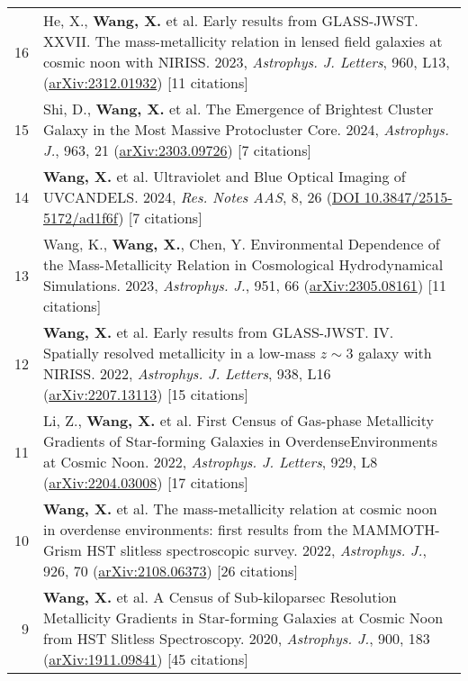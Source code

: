 \documentclass[letterpaper,10pt]{article}
\begin{document}
\begin{longtable}{rp{6.3in}}
    16 & He, X., \textbf{Wang, X.} et al. Early results from GLASS-JWST. XXVII. The mass-metallicity relation in lensed field galaxies at cosmic noon with NIRISS. 2023, \textit{Astrophys. J. Letters}, 960, L13, (\href{https://arxiv.org/abs/2312.01932}{arXiv:2312.01932}) [11 citations] \\

    15 & Shi, D., \textbf{Wang, X.} et al. The Emergence of Brightest Cluster Galaxy in the Most Massive Protocluster Core. 2024, \textit{Astrophys. J.}, 963, 21 (\href{https://arxiv.org/abs/2303.09726}{arXiv:2303.09726}) [7 citations] \\

    14 &  \textbf{Wang, X.} et al. Ultraviolet and Blue Optical Imaging of UVCANDELS. 2024, \textit{Res. Notes AAS}, 8, 26 (\href{https://iopscience.iop.org/article/10.3847/2515-5172/ad1f6f}{DOI 10.3847/2515-5172/ad1f6f}) [7 citations] \\

    13 &  Wang, K., \textbf{Wang, X.}, Chen, Y. Environmental Dependence of the Mass-Metallicity Relation in Cosmological Hydrodynamical Simulations. 2023, \textit{Astrophys. J.}, 951, 66 (\href{https://arxiv.org/abs/2305.08161}{arXiv:2305.08161}) [11 citations] \\

    12 &  \textbf{Wang, X.} et al. Early results from GLASS-JWST. IV. Spatially resolved metallicity in a low-mass $z\sim3$ galaxy with NIRISS. 2022, \textit{Astrophys. J. Letters}, 938, L16 (\href{https://arxiv.org/abs/2207.13113}{arXiv:2207.13113}) [15 citations] \\

    11 &  Li, Z., \textbf{Wang, X.} et al. First Census of Gas-phase Metallicity Gradients of Star-forming Galaxies in OverdenseEnvironments at Cosmic Noon. 2022, \textit{Astrophys. J. Letters}, 929, L8 (\href{https://arxiv.org/abs/2204.03008}{arXiv:2204.03008}) [17 citations] \\

    10 &  \textbf{Wang, X.} et al. The mass-metallicity relation at cosmic noon in overdense environments: first results from the MAMMOTH-Grism HST slitless spectroscopic survey. 2022, \textit{Astrophys. J.}, 926, 70 (\href{https://arxiv.org/abs/2108.06373}{arXiv:2108.06373}) [26 citations] \\

    9 &  \textbf{Wang, X.} et al. A Census of Sub-kiloparsec Resolution Metallicity Gradients in Star-forming Galaxies at Cosmic Noon from HST Slitless Spectroscopy. 2020, \textit{Astrophys. J.}, 900, 183 (\href{https://arxiv.org/abs/1911.09841}{arXiv:1911.09841}) [45 citations] \\


\end{longtable}
\end{document}
